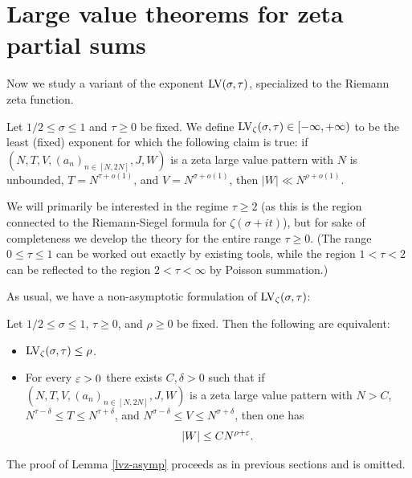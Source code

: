 \chapter{Large value theorems for zeta partial sums}\label{largevalue-zeta-chapter}

Now we study a variant of the exponent $\mathrm{LV}(\sigma,\tau)$, specialized to the Riemann zeta function.

\begin{definition}\label{lvz-def} Let $1/2 \leq \sigma \leq 1$ and $\tau \geq 0$ be fixed. We define $\mathrm{LV}_\zeta(\sigma,\tau) \in [-\infty, +\infty)$ to be the least (fixed) exponent for which the following claim is true: if $(N,T,V,(a_n)_{n \in [N,2N]},J,W)$ is a zeta large value pattern with $N$ is unbounded, $T = N^{\tau+o(1)}$, and $V = N^{\sigma+o(1)}$, then $|W| \ll N^{\rho+o(1)}$.
\end{definition}


We will primarily be interested in the regime $\tau \geq 2$ (as this is the region connected to the Riemann-Siegel formula for $\zeta(\sigma+it)$), but for sake of completeness we develop the theory for the entire range $\tau \geq 0$.  (The range $0 \leq \tau \leq 1$ can be worked out exactly by existing tools, while the region $1 < \tau < 2$ can be reflected to the region $2 < \tau < \infty$ by Poisson summation.)

As usual, we have a non-asymptotic formulation of $\mathrm{LV}_\zeta(\sigma,\tau)$:

\begin{lemma}\label{lvz-asymp} Let $1/2 \leq \sigma \leq 1$, $\tau \geq 0$, and $\rho \geq 0$  be fixed.  Then the following are equivalent:
    \begin{itemize}
        \item[(i)] $\mathrm{LV}_\zeta(\sigma,\tau) \leq \rho$.
        \item[(ii)] For every $\varepsilon>0$ there exists $C,\delta>0$ such that if $(N,T,V,(a_n)_{n \in [N,2N]},J,W)$ is a zeta large value pattern with $N > C$, $N^{\tau-\delta} \leq T \leq N^{\tau+\delta}$, and $N^{\sigma-\delta} \leq V \leq N^{\sigma+\delta}$, then one has
              $$ |W| \leq C N^{\rho+\varepsilon}.$$
    \end{itemize}
\end{lemma}

The proof of Lemma \ref{lvz-asymp} proceeds as in previous sections and is omitted.

